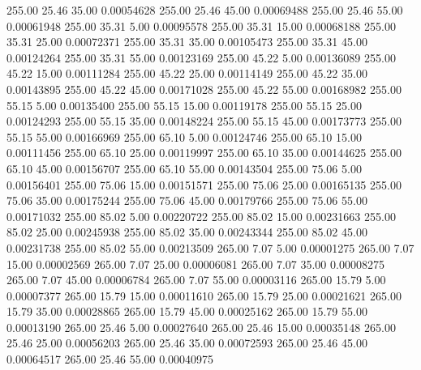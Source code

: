     255.00     25.46     35.00     0.00054628
    255.00     25.46     45.00     0.00069488
    255.00     25.46     55.00     0.00061948
    255.00     35.31      5.00     0.00095578
    255.00     35.31     15.00     0.00068188
    255.00     35.31     25.00     0.00072371
    255.00     35.31     35.00     0.00105473
    255.00     35.31     45.00     0.00124264
    255.00     35.31     55.00     0.00123169
    255.00     45.22      5.00     0.00136089
    255.00     45.22     15.00     0.00111284
    255.00     45.22     25.00     0.00114149
    255.00     45.22     35.00     0.00143895
    255.00     45.22     45.00     0.00171028
    255.00     45.22     55.00     0.00168982
    255.00     55.15      5.00     0.00135400
    255.00     55.15     15.00     0.00119178
    255.00     55.15     25.00     0.00124293
    255.00     55.15     35.00     0.00148224
    255.00     55.15     45.00     0.00173773
    255.00     55.15     55.00     0.00166969
    255.00     65.10      5.00     0.00124746
    255.00     65.10     15.00     0.00111456
    255.00     65.10     25.00     0.00119997
    255.00     65.10     35.00     0.00144625
    255.00     65.10     45.00     0.00156707
    255.00     65.10     55.00     0.00143504
    255.00     75.06      5.00     0.00156401
    255.00     75.06     15.00     0.00151571
    255.00     75.06     25.00     0.00165135
    255.00     75.06     35.00     0.00175244
    255.00     75.06     45.00     0.00179766
    255.00     75.06     55.00     0.00171032
    255.00     85.02      5.00     0.00220722
    255.00     85.02     15.00     0.00231663
    255.00     85.02     25.00     0.00245938
    255.00     85.02     35.00     0.00243344
    255.00     85.02     45.00     0.00231738
    255.00     85.02     55.00     0.00213509
    265.00      7.07      5.00     0.00001275
    265.00      7.07     15.00     0.00002569
    265.00      7.07     25.00     0.00006081
    265.00      7.07     35.00     0.00008275
    265.00      7.07     45.00     0.00006784
    265.00      7.07     55.00     0.00003116
    265.00     15.79      5.00     0.00007377
    265.00     15.79     15.00     0.00011610
    265.00     15.79     25.00     0.00021621
    265.00     15.79     35.00     0.00028865
    265.00     15.79     45.00     0.00025162
    265.00     15.79     55.00     0.00013190
    265.00     25.46      5.00     0.00027640
    265.00     25.46     15.00     0.00035148
    265.00     25.46     25.00     0.00056203
    265.00     25.46     35.00     0.00072593
    265.00     25.46     45.00     0.00064517
    265.00     25.46     55.00     0.00040975
